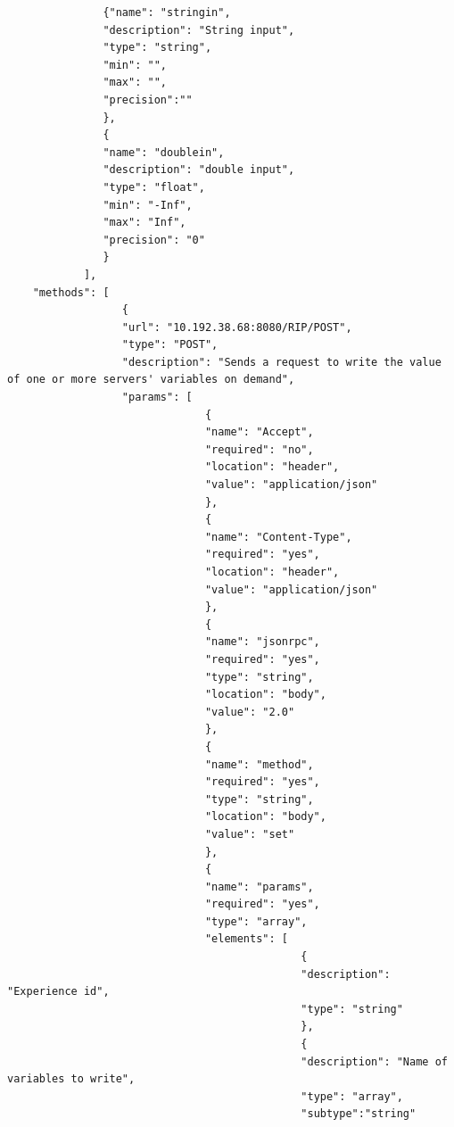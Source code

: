 \begin{lstlisting}
               {"name": "stringin",
               "description": "String input",
               "type": "string",
               "min": "",
               "max": "",
               "precision":""
               },
               {
               "name": "doublein",
               "description": "double input",
               "type": "float",
               "min": "-Inf",
               "max": "Inf",
               "precision": "0"
               }
            ],
    "methods": [
                  {
                  "url": "10.192.38.68:8080/RIP/POST",
                  "type": "POST",
                  "description": "Sends a request to write the value of one or more servers' variables on demand",
                  "params": [
                               {
                               "name": "Accept",
                               "required": "no",
                               "location": "header",
                               "value": "application/json"
                               },
                               {
                               "name": "Content-Type",
                               "required": "yes",
                               "location": "header",
                               "value": "application/json"
                               },
                               {
                               "name": "jsonrpc",
                               "required": "yes",
                               "type": "string",
                               "location": "body",
                               "value": "2.0"
                               },
                               {
                               "name": "method",
                               "required": "yes",
                               "type": "string",
                               "location": "body",
                               "value": "set"
                               },
                               {
                               "name": "params",
                               "required": "yes",
                               "type": "array",
                               "elements": [
                                              {
                                              "description": "Experience id",
                                              "type": "string"
                                              },
                                              {
                                              "description": "Name of variables to write",
                                              "type": "array",
                                              "subtype":"string"

\end{lstlisting}
